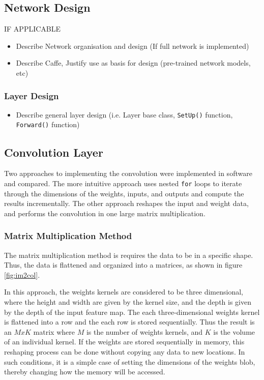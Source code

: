 \documentclass[12pt]{article}
\begin{document}
\subsection{Network Design}
\label{sec:Design-Network}


IF APPLICABLE
\begin{itemize}
\item Describe Network organisation and design (If full network is implemented)
\item Describe Caffe, Justify use as basis for design (pre-trained network models, etc)
\end{itemize}

\subsubsection{Layer Design}
\label{sec:Design-Network-Layers}


\begin{itemize}
\item Describe general layer design (i.e. Layer base class, \verb|SetUp()| function, \verb|Forward()| function)
\end{itemize}

\subsection{Convolution Layer}
\label{sec:Imp-Conv}

Two approaches to implementing the convolution were implemented in software and compared. The more intuitive approach uses nested \lstinline|for| loops to iterate through the dimensions of the weights, inputs, and outputs and compute the results incrementally. The other approach reshapes the input and weight data, and performs the convolution in one large matrix multiplication. 

\subsubsection{Matrix Multiplication Method}
\label{sec:Imp-Conv-MM}

The matrix multiplication method is requires the data to be in a specific shape. Thus, the data is flattened and organized into a matrices, as shown in figure \ref{fig:im2col}. 

In this approach, the weights kernels are considered to be three dimensional, where the height and width are given by the kernel size, and the depth is given by the depth of the input feature map. The each three-dimensional weights kernel is flattened into a row and the each row is stored sequentially. Thus the result is an $MxK$ matrix where $M$ is the number of weights kernels, and $K$ is the volume of an individual kernel. If the weights are stored sequentially in memory, this reshaping process can be done without copying any data to new locations. In such conditions, it is a simple case of setting the dimensions of the weights blob, thereby changing how the memory will be accessed.
\end{document}
